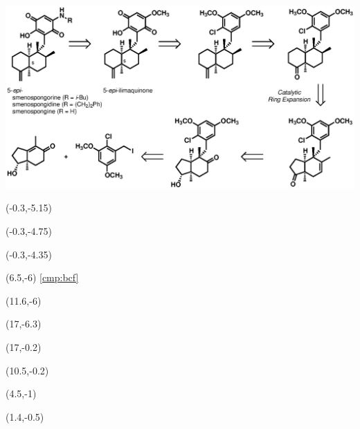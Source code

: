 \begin{Scheme}[t]
  \centering \includegraphics[scale=0.8]{chp_singlecarbon/images/retrosynthesis}
  \caption{Retrosynthetic analysis for 5-\textit{epi}-ilimaquinone and related
  aminoquinones.}
\begin{textblock}{1}(-0.3,-5.15)  \end{textblock}
\begin{textblock}{1}(-0.3,-4.75)  \end{textblock}
\begin{textblock}{1}(-0.3,-4.35)  \end{textblock}
\begin{textblock}{1}(6.5,-6) \textsf{\scriptsize{\ref{cmp:bcf}}} \end{textblock}
\begin{textblock}{1}(11.6,-6)  \end{textblock}
\begin{textblock}{1}(17,-6.3)  \end{textblock}
\begin{textblock}{1}(17,-0.2)  \end{textblock}
\begin{textblock}{1}(10.5,-0.2)  \end{textblock}
\begin{textblock}{1}(4.5,-1) \end{textblock}
\begin{textblock}{1}(1.4,-0.5)  \end{textblock}
  \label{sch:retrosynthesis}
\end{Scheme}

